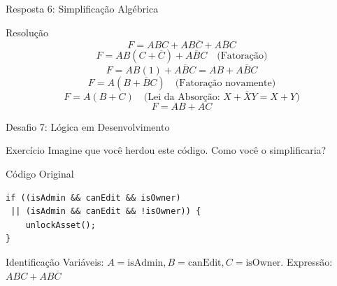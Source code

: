\documentclass[9pt]{beamer}
\begin{document}
\begin{frame}{Resposta 6: Simplificação Algébrica}

\begin{alertblock}{Resolução}
\[ F = ABC + AB\overline{C} + A\overline{B}C \]
\[ F = AB(C + \overline{C}) + A\overline{B}C \quad \text{(Fatoração)} \]
\[ F = AB(1) + A\overline{B}C = AB + A\overline{B}C \]
\[ F = A(B + \overline{B}C) \quad \text{(Fatoração novamente)} \]
\[ F = A(B + C) \quad \text{(Lei da Absorção: } X+\overline{X}Y = X+Y) \]
\[ \boxed{F = AB + AC} \]
\end{alertblock}

\begin{center}
\end{center}

\end{frame}

\begin{frame}[fragile]{Desafio 7: Lógica em Desenvolvimento}

\begin{block}{Exercício}
Imagine que você herdou este código. Como você o simplificaria?
\end{block}

\begin{alertblock}{Código Original}
\begin{verbatim}
if ((isAdmin && canEdit && isOwner) 
 || (isAdmin && canEdit && !isOwner)) {
    unlockAsset();
}
\end{verbatim}
\end{alertblock}

\begin{block}{Identificação}
Variáveis: $A=\text{isAdmin}, B=\text{canEdit}, C=\text{isOwner}$.
Expressão: $ABC + AB\overline{C}$
\end{block}

\end{frame}
\end{document}
